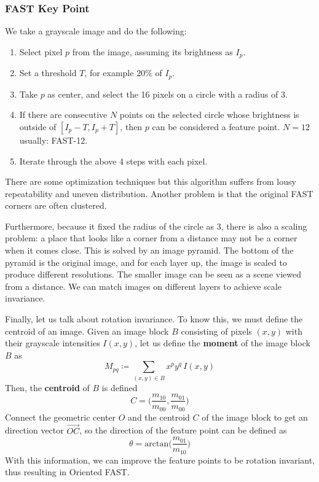\documentclass{article}
\theoremstyle{definition}
\theoremstyle{remark}
\theoremstyle{definition}
\begin{document}
\subsubsection{FAST Key Point}
We take a grayscale image and do the following: 
\begin{enumerate}
    \item Select pixel $p$ from the image, assuming its brightness as $I_p$. 
    \item Set a threshold $T$, for example $20\%$ of $I_p$. 
    \item Take $p$ as center, and select the 16 pixels on a circle with a radius of $3$. 
    \item If there are consecutive $N$ points on the selected circle whose brightness is outside of $[I_p - T, I_p + T]$, then $p$ can be considered a feature point. $N = 12$ usually: FAST-12. 
    \item Iterate through the above 4 steps with each pixel. 
\end{enumerate}
There are some optimization techniques but this algorithm suffers from lousy repeatability and uneven distribution. Another problem is that the original FAST corners are often clustered. 

Furthermore, because it fixed the radius of the circle as $3$, there is also a scaling problem: a place that looks like a corner from a distance may not be a corner when it comes close. This is solved by an image pyramid. The bottom of the pyramid is the original image, and for each layer up, the image is scaled to produce different resolutions. The smaller image can be seen as a scene viewed from a distance. We can match images on different layers to achieve scale invariance. 

Finally, let us talk about rotation invariance. To know this, we must define the centroid of an image. Given an image block $B$ consisting of pixels $(x, y)$ with their grayscale intensities $I(x, y)$, let us define the \textbf{moment} of the image block $B$ as 
\[M_{p q} \coloneqq \sum_{(x, y) \in B} x^p y^q \, I(x, y)\]
Then, the \textbf{centroid} of $B$ is defined 
\[C = \bigg(\frac{m_{10}}{m_{00}} , \frac{m_{01}}{m_{00}} \bigg)\]
Connect the geometric center $O$ and the centroid $C$ of the image block to get an direction vector $\overrightarrow{OC}$, so the direction of the feature point can be defined as 
\[\theta = \mathrm{arctan}\Big( \frac{m_{01}}{m_{10}} \Big)\]
With this information, we can improve the feature points to be rotation invariant, thus resulting in Oriented FAST. 
\end{document}

